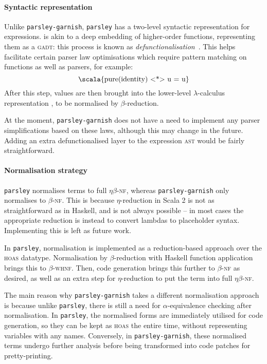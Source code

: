 \documentclass[../../../main.tex]{subfiles}
\begin{document}
\paragraph{Syntactic representation}
Unlike \texttt{parsley-garnish}, \texttt{parsley} has a two-level syntactic representation for expressions.
 is akin to a deep embedding of higher-order functions, representing them as a \textsc{gadt}: this process is known as \emph{defunctionalisation}~\cite{reynolds_defunc_1972,danvy_defunctionalization_2001}.
This helps facilitate certain parser law optimisations which require pattern matching on functions as well as parsers, for example:
\begin{equation*}
\text{\scala{pure(identity) <*> u = u}}
\end{equation*}
After this step,  values are then brought into the lower-level $\lambda$-calculus representation , to be normalised by $\beta$-reduction.

At the moment, \texttt{parsley-garnish} does not have a need to implement any parser simplifications based on these laws, although this may change in the future.
Adding an extra defunctionalised layer to the expression \textsc{ast} would be fairly straightforward.

\paragraph{Normalisation strategy}
\texttt{parsley} normalises terms to full $\eta\beta$-\textsc{nf}, whereas \texttt{parsley-garnish} only normalises to $\beta$-\textsc{nf}.
This is because $\eta$-reduction in Scala 2 is not as straightforward as in Haskell, and is not always possible -- in most cases the appropriate reduction is instead to convert lambdas to placeholder syntax.
Implementing this is left as future work.

In \texttt{parsley}, normalisation is implemented as a reduction-based approach over the \textsc{hoas}  datatype.
Normalisation by $\beta$-reduction with Haskell function application brings this to $\beta$-\textsc{whnf}.
Then, code generation brings this further to $\beta$-\textsc{nf} as desired, as well as an extra step for $\eta$-reduction to put the term into full $\eta\beta$-\textsc{nf}.

The main reason why \texttt{parsley-garnish} takes a different normalisation approach is because unlike \texttt{parsley}, there is still a need for $\alpha$-equivalence checking after normalisation.
In \texttt{parsley}, the normalised forms are immediately utilised for code generation, so they can be kept as \textsc{hoas} the entire time, without representing variables with any names.
Conversely, in \texttt{parsley-garnish}, these normalised terms undergo further analysis before being transformed into code patches for pretty-printing.
\end{document}
